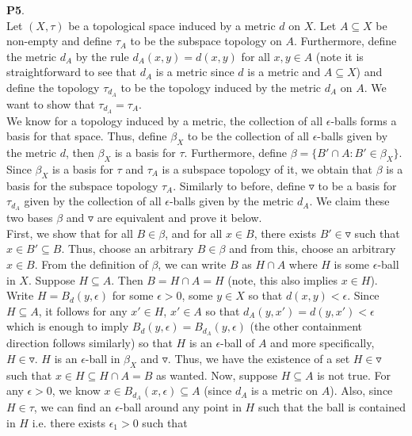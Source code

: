 \documentclass{article}
\begin{document}
    \newpage

    \textbf{P5}.\\
    Let $(X,\tau)$ be a topological space induced by a metric $d$ on $X$. Let $A\subseteq X$ be non-empty and define $\tau_A$ to be the subspace topology 
    on $A$. Furthermore, define the metric $d_A$ by the rule $d_A(x,y) = d(x,y)$ for all $x,y\in A$ (note it is straightforward to see that $d_A$ is a metric
    since $d$ is a metric and $A\subseteq X$) and define the topology $\tau_{d_A}$ to be the topology induced by the metric $d_A$ on $A$. We want to show that
    $\tau_{d_A} = \tau_A$.\\
    We know for a topology induced by a metric, the collection of all $\epsilon$-balls forms a basis for that space. Thus, define $\beta_X$ to be the collection
    of all $\epsilon$-balls given by the metric $d$, then $\beta_X$ is a basis for $\tau$. Furthermore, define $\beta = \{B' \cap A: B'\in\beta_X\}$. Since
    $\beta_X$ is a basis for $\tau$ and $\tau_A$ is a subspace topology of it, we obtain that $\beta$ is a basis for the subspace topology $\tau_A$. Similarly to before,
    define $\triangledown$ to be a basis for $\tau_{d_A}$ given by the collection of all $\epsilon$-balls given by the metric $d_A$. We claim these two bases 
    $\beta$ and $\triangledown$ are equivalent and prove it below.\\
    First, we show that for all $B\in\beta$, and for all $x\in B$, there exists $B'\in\triangledown$ such that $x\in B'\subseteq B$. Thus, choose an arbitrary
    $B\in\beta$ and from this, choose an arbitrary $x\in B$. From the definition of $\beta$, we can write $B$ as $H \cap A$ where $H$ is some $\epsilon$-ball in $X$.
    Suppose $H\subseteq A$. Then $B = H \cap A = H$ (note, this also implies $x\in H$). 
    Write $H = B_d(y,\epsilon)$ for some $\epsilon>0$, some $y\in X$ so that $d(x,y)<\epsilon$. Since $H\subseteq A$, it follows for any $x'\in H$, $x'\in A$ so that
    $d_A(y,x') =  d(y,x') < \epsilon$ which is enough to imply $B_d(y,\epsilon) = B_{d_A}(y,\epsilon)$ (the other containment direction follows similarly) so 
    that $H$ is an $\epsilon$-ball of $A$ and more specifically, $H\in\triangledown$.
    $H$ is an $\epsilon$-ball in $\beta_X$ and $\triangledown$. Thus, we have the existence of a set $H\in\triangledown$ such that $x\in H\subseteq H \cap A = B$ 
    as wanted. Now, suppose $H\subseteq A$ is not true. For any $\epsilon > 0$, we know $x\in B_{d_A}(x,\epsilon)\subseteq A$ (since $d_A$ is a metric on $A$).
    Also, since $H\in\tau$, we can find an $\epsilon$-ball around any point in $H$ such that the ball is contained in $H$ i.e. there exists $\epsilon_1>0$ such that
\end{document}
